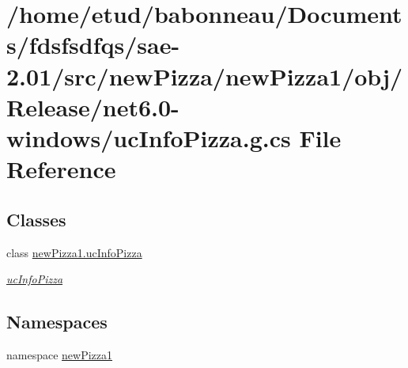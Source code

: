 \hypertarget{Release_2net6_80-windows_2ucInfoPizza_8g_8cs}{}\section{/home/etud/babonneau/\+Documents/fdsfsdfqs/sae-\/2.01/src/new\+Pizza/new\+Pizza1/obj/\+Release/net6.0-\/windows/uc\+Info\+Pizza.g.\+cs File Reference}
\label{Release_2net6_80-windows_2ucInfoPizza_8g_8cs}
\subsection*{Classes}
\begin{DoxyCompactItemize}
\item 
class \hyperlink{classnewPizza1_1_1ucInfoPizza}{new\+Pizza1.\+uc\+Info\+Pizza}
\begin{DoxyCompactList}\small\item\em \hyperlink{classnewPizza1_1_1ucInfoPizza}{uc\+Info\+Pizza} \end{DoxyCompactList}\end{DoxyCompactItemize}
\subsection*{Namespaces}
\begin{DoxyCompactItemize}
\item 
namespace \hyperlink{namespacenewPizza1}{new\+Pizza1}
\end{DoxyCompactItemize}
